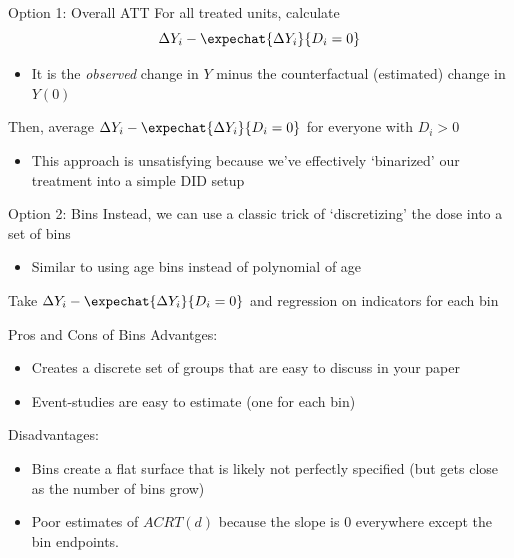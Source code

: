 \documentclass[aspectratio=169,t]{beamer}
\begin{document}
\begin{frame}{Option 1: Overall ATT}
  For all treated units, calculate
  $$
    \Delta Y_i - \expechat{\Delta Y_i}{D_i = 0}
  $$
  \begin{itemize}
    \item It is the \emph{observed} change in $Y$ minus the counterfactual (estimated) change in $Y(0)$
  \end{itemize}

  \bigskip
  Then, average $\Delta Y_i - \expechat{\Delta Y_i}{D_i = 0}$ for everyone with $D_i > 0$
  \begin{itemize}
    \item This approach is unsatisfying because we've effectively `binarized' our treatment into a simple DID setup
  \end{itemize}
\end{frame}


\begin{frame}{Option 2: Bins}
  Instead, we can use a classic trick of `discretizing' the dose into a set of bins
  \begin{itemize}
    \item Similar to using age bins instead of polynomial of age
  \end{itemize}

  \pause
  \bigskip
  Take $\Delta Y_i - \expechat{\Delta Y_i}{D_i = 0}$ and regression on indicators for each bin
\end{frame}


\begin{frame}{Pros and Cons of Bins}
  Advantges:
  \begin{itemize}
    \item Creates a discrete set of groups that are easy to discuss in your paper

    \item Event-studies are easy to estimate (one for each bin)
  \end{itemize}

  \bigskip
  Disadvantages:
  \begin{itemize}
    \item Bins create a flat surface that is likely not perfectly specified (but gets close as the number of bins grow)
    
    \item Poor estimates of $ACRT(d)$ because the slope is 0 everywhere except the bin endpoints.
  \end{itemize}
\end{frame}
\end{document}
